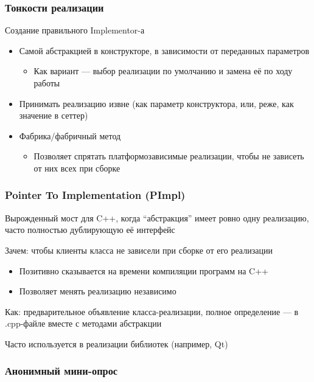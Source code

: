 \documentclass[xetex,mathserif,serif]{beamer}
\begin{document}
    \begin{frame}
        \frametitle{Тонкости реализации}
        Создание правильного Implementor-а
        \begin{itemize}
            \item Самой абстракцией в конструкторе, в зависимости от переданных параметров
            \begin{itemize}
                \item Как вариант --- выбор реализации по умолчанию и замена её по ходу работы
            \end{itemize}
            \item Принимать реализацию извне (как параметр конструктора, или, реже, как значение в сеттер)
            \item Фабрика/фабричный метод
            \begin{itemize}
                \item Позволяет спрятать платформозависимые реализации, чтобы не зависеть от них всех при сборке
            \end{itemize}
        \end{itemize}
    \end{frame}

    \begin{frame}
        \frametitle{Pointer To Implementation (PImpl)}
        Вырожденный мост для C++, когда ``абстракция'' имеет ровно одну реализацию, часто полностью дублирующую её интерфейс

        Зачем: чтобы клиенты класса не зависели при сборке от его реализации

        \begin{itemize}
            \item Позитивно сказывается на времени компиляции программ на C++
            \item Позволяет менять реализацию независимо
        \end{itemize}

        Как: предварительное объявление класса-реализации, полное определение --- в .cpp-файле вместе с методами абстракции

        Часто используется в реализации библиотек (например, Qt)
    \end{frame}

    \begin{frame}
        \frametitle{Анонимный мини-опрос}
    \end{frame}
\end{document}
